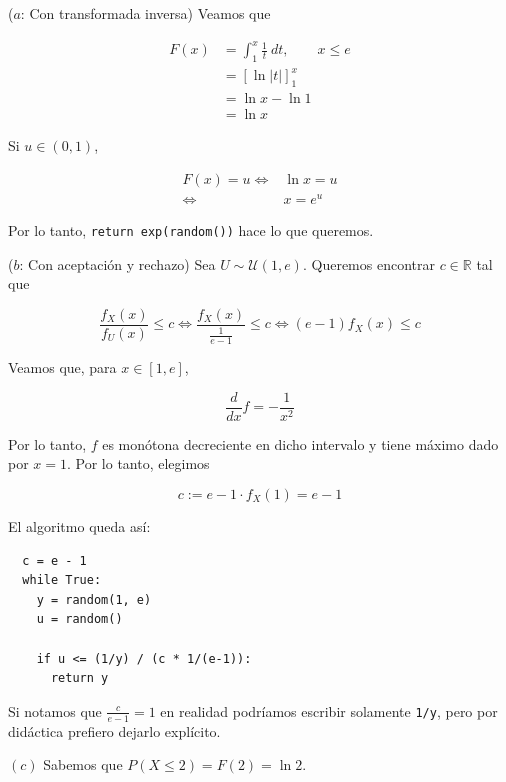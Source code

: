 \documentclass[a4paper, 12pt]{article}
\begin{document}
($a$: Con transformada inversa) Veamos que 

\begin{align*}
  F(x) &= \int_1^x \frac{1}{t} ~ dt, \qquad x \leq e \\ 
       &=\left[ \ln \left| t \right|  \right]_1^x \\ 
       &= \ln x - \ln 1 \\ 
       &= \ln x
\end{align*}

Si $u \in (0, 1)$,

\begin{align*}
  F(x) = u 
  \iff& \ln x = u \\ 
  \iff& x = e^u
\end{align*}

Por lo tanto, \texttt{return exp(random())} hace lo que queremos.

($b$: Con aceptación y rechazo) Sea $U \sim \mathcal{U}(1, e)$. Queremos
encontrar $c \in \mathbb{R}$ tal que 

\begin{equation*}
  \frac{ f_X(x) }{f_U(x)} \leq c \iff \frac{f_X(x)}{\frac{1}{e-1}} \leq c \iff
  (e-1)f_X(x) \leq c
\end{equation*}

Veamos que, para $x \in [1, e]$,

\begin{equation*}
  \frac{d}{dx}f = -\frac{1}{x^2}
\end{equation*}

Por lo  tanto, $f$ es monótona decreciente en dicho intervalo y tiene máximo
dado por $x = 1$. Por lo tanto, elegimos

\begin{equation*}
c:= e-1 \cdot f_X(1) = e-1
\end{equation*}

El algoritmo queda así:

\footnotesize 
\begin{verbatim}
  c = e - 1 
  while True:
    y = random(1, e)
    u = random() 
  
    if u <= (1/y) / (c * 1/(e-1)):
      return y
\end{verbatim}

Si notamos que $\frac{c}{e - 1} = 1$ en realidad podríamos escribir solamente
\texttt{1/y}, pero por didáctica prefiero dejarlo explícito.

$(c)$ Sabemos que $P(X \leq 2) = F(2) = \ln 2$.


\pagebreak 
\end{document}
